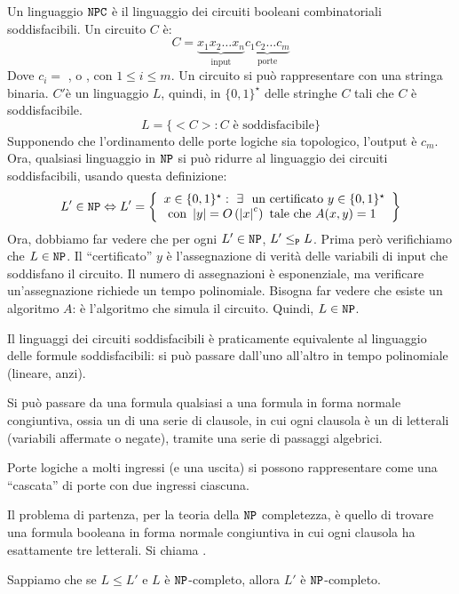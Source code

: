 Un linguaggio $\texttt{NPC}$ \`e il linguaggio dei circuiti booleani combinatoriali soddisfacibili. Un circuito $C$ \`e:
\[
C = \underbrace{x_1 x_2 \ldots x_n}_{\text{input}} \underbrace{c_1 c_2 \ldots c_m}_{\text{porte}}
\]
Dove $c_i =$ ,  o , con $1 \le i \le m$. Un circuito si pu\`o rappresentare con una stringa binaria. $C'$\`e un linguaggio $L$, quindi, in $\{0,1\}^{\star}$ delle stringhe $C$ tali che $C$ \`e soddisfacibile.
\[
L = \{ < C > : C \text{ \`e soddisfacibile} \}
\]
Supponendo che l'ordinamento delle porte logiche sia topologico, l'output \`e $c_m$. Ora, qualsiasi linguaggio in $\texttt{NP}$ si pu\`o ridurre al linguaggio dei circuiti soddisfacibili, usando questa definizione:
\[
L' \in \code{NP} \iff 
L' = \left\{ 
\begin{array}{l}
x \in \{0,1\}^{\star} : \exists \text{ un certificato } y \in \{0,1\}^{\star} \\
\text{ con } \abs{y} = O \left( \abs{x}^c \right) \text{ tale che } A (x, y) = 1 
\end{array}
\right\}
\]
Ora, dobbiamo far vedere che per ogni $L' \in \texttt{NP}$, $L' \le_{\texttt{P}} L$. Prima per\`o verifichiamo che $L \in \texttt{NP}$. Il ``certificato'' $y$ \`e l'assegnazione di verit\`a delle variabili di input che soddisfano il circuito. Il numero di assegnazioni \`e esponenziale, ma verificare un'assegnazione richiede un tempo polinomiale. Bisogna far vedere che esiste un algoritmo $A$: \`e l'algoritmo che simula il circuito. Quindi, $L \in \texttt{NP}$.

Il linguaggi dei circuiti soddisfacibili \`e praticamente equivalente al linguaggio delle formule soddisfacibili: si pu\`o passare dall'uno all'altro in tempo polinomiale (lineare, anzi).

Si pu\`o passare da una formula qualsiasi a una formula in forma normale congiuntiva, ossia un  di una serie di clausole, in cui ogni clausola \`e un  di letterali (variabili affermate o negate), tramite una serie di passaggi algebrici.

Porte logiche a molti ingressi (e una uscita) si possono rappresentare come una ``cascata'' di porte con due ingressi ciascuna. 

Il problema di partenza, per la teoria della $\texttt{NP}$ completezza, \`e quello di trovare una formula booleana in forma normale congiuntiva in cui ogni clausola ha esattamente tre letterali. Si chiama .

Sappiamo che se $L \le L'$ e $L$ \`e $\texttt{NP}$-completo, allora $L'$ \`e $\texttt{NP}$-completo.

